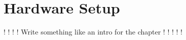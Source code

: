 \chapter{Hardware Setup}\label{ch:hardware}

! ! ! ! Write something like an intro for the chapter ! ! ! ! !